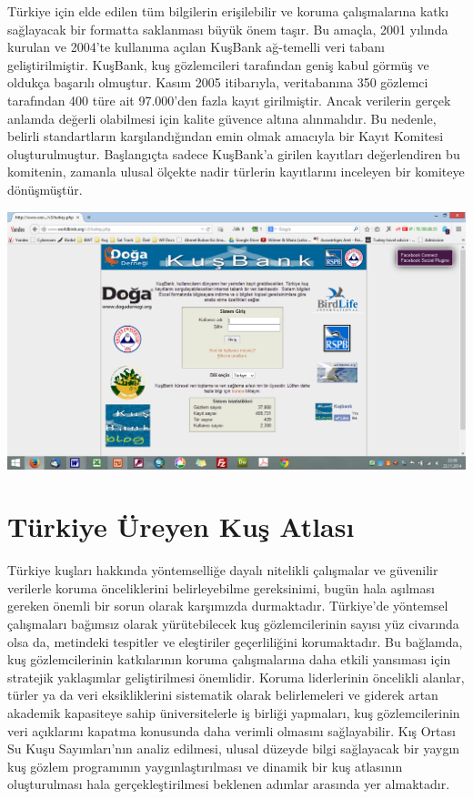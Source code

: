\documentclass[
  a4paper,
  DIV=11,
  numbers=noendperiod]{scrartcl}
\begin{document}
Türkiye için elde edilen tüm bilgilerin erişilebilir ve koruma
çalışmalarına katkı sağlayacak bir formatta saklanması büyük önem taşır.
Bu amaçla, 2001 yılında kurulan ve 2004'te kullanıma açılan KuşBank
ağ-temelli veri tabanı geliştirilmiştir. KuşBank, kuş gözlemcileri
tarafından geniş kabul görmüş ve oldukça başarılı olmuştur. Kasım 2005
itibarıyla, veritabanına 350 gözlemci tarafından 400 türe ait 97.000'den
fazla kayıt girilmiştir. Ancak verilerin gerçek anlamda değerli
olabilmesi için kalite güvence altına alınmalıdır. Bu nedenle, belirli
standartların karşılandığından emin olmak amacıyla bir Kayıt Komitesi
oluşturulmuştur. Başlangıçta sadece KuşBank'a girilen kayıtları
değerlendiren bu komitenin, zamanla ulusal ölçekte nadir türlerin
kayıtlarını inceleyen bir komiteye dönüşmüştür.

\includegraphics{images/kusbank.png}

\section*{Türkiye Üreyen Kuş
Atlası}\label{tuxfcrkiye-uxfcreyen-kuux15f-atlasux131}


Türkiye kuşları hakkında yöntemselliğe dayalı nitelikli çalışmalar ve
güvenilir verilerle koruma önceliklerini belirleyebilme gereksinimi,
bugün hala aşılması gereken önemli bir sorun olarak karşımızda
durmaktadır. Türkiye'de yöntemsel çalışmaları bağımsız olarak
yürütebilecek kuş gözlemcilerinin sayısı yüz civarında olsa da,
metindeki tespitler ve eleştiriler geçerliliğini korumaktadır. Bu
bağlamda, kuş gözlemcilerinin katkılarının koruma çalışmalarına daha
etkili yansıması için stratejik yaklaşımlar geliştirilmesi önemlidir.
Koruma liderlerinin öncelikli alanlar, türler ya da veri eksikliklerini
sistematik olarak belirlemeleri ve giderek artan akademik kapasiteye
sahip üniversitelerle iş birliği yapmaları, kuş gözlemcilerinin veri
açıklarını kapatma konusunda daha verimli olmasını sağlayabilir. Kış
Ortası Su Kuşu Sayımları'nın analiz edilmesi, ulusal düzeyde bilgi
sağlayacak bir yaygın kuş gözlem programının yaygınlaştırılması ve
dinamik bir kuş atlasının oluşturulması hala gerçekleştirilmesi beklenen
adımlar arasında yer almaktadır.
\end{document}
